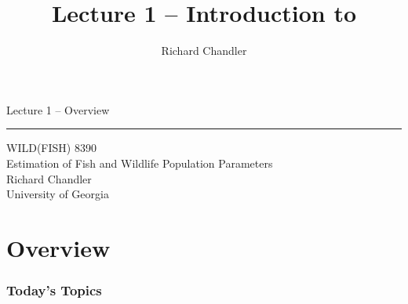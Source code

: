 \documentclass{beamer}\usepackage[]{graphicx}\usepackage[]{color}
\title{Lecture 1 -- Introduction to }
\author{Richard Chandler}
\begin{document}



\begin{frame}[plain]
  \LARGE
  \centering
  {\huge %
    Lecture 1 -- Overview} \\
  {\color{default} \rule{\textwidth}{0.1pt}}
  \vfill
  \large
  WILD(FISH) 8390 \\
  Estimation of Fish and Wildlife Population Parameters \\
  \vfill
  Richard Chandler \\
  University of Georgia \\
\end{frame}




\section{Overview}


\begin{frame}[plain]
  \frametitle{Today's Topics}
  \Large
\end{frame}


\end{document}
